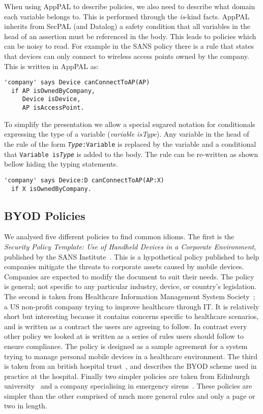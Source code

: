 \documentclass{article}
\begin{document}
When using AppPAL to describe policies, we also need to describe what domain each variable belongs to.
This is performed through the \emph{is}-kind facts.
AppPAL inherits from SecPAL (and Datalog) a safety condition that all variables in the head of an assertion must be referenced in the body.
This leads to policies which can be noisy to read.
For example in the SANS policy there is a rule that states that devices can only connect to wireless access points owned by the company.
This is written in AppPAL as:
\begin{lstlisting}
'company' says Device canConnectToAP(AP)
  if AP isOwnedByCompany,
     Device isDevice,
     AP isAccessPoint.
\end{lstlisting}
To simplify the presentation we allow a special sugared notation for conditionals expressing the type of a variable (\emph{variable \emph{is}Type}).
Any variable in the head of the rule of the form \texttt{\emph{Type}:Variable} is replaced by the variable and a conditional that \texttt{Variable is\emph{Type}} is added to the body.
The rule can be re-written as shown bellow hiding the typing statements.
\begin{lstlisting}
'company' says Device:D canConnectToAP(AP:X)
  if X isOwnedByCompany.
\end{lstlisting}

\subsection{BYOD Policies}

We analysed five different policies to find common idioms.
The first is the \emph{Security Policy Template: Use of Handheld Devices in a Corporate Environment}, published by the SANS Institute~\cite{nicholas_r._c._guerin_security_2008}.
This is a hypothetical policy published to help companies mitigate the threats to corporate assets caused by mobile devices. 
Companies are expected to modify the document to suit their needs.  
The policy is general; not specific to any particular industry, device, or country's legislation.
The second is taken from Healthcare Information Management System Society~\cite{healthcare_information_and_management_systems_society_mobile_2012}; 
  a US non-profit company trying to improve healthcare through IT.  
It is relatively short but interesting because it contains concerns specific to healthcare scenarios, and is written as a contract the users are agreeing to follow. 
In contrast every other policy we looked at is written as a series of rules users should follow to ensure compliance.
The policy is designed as a sample agreement for a system trying to manage personal mobile devices in a healthcare environment.
The third is taken from an british hospital trust~\cite{kennington_mobiles_2014}, and describes the BYOD scheme used in practice at the hospital. 
Finally two simpler policies are taken from Edinburgh university~\cite{david_williamson_bring_2015} and a company specialising in emergency sirens~\cite{code3pse.org_sample_????}. 
These policies are simpler than the other comprised of much more general rules and only a page or two in length.
\end{document}
